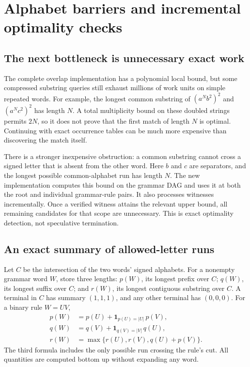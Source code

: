 \section{Alphabet barriers and incremental optimality checks}
\label{sec:lcs-bounds}

\subsection{The next bottleneck is unnecessary exact work}

The complete overlap implementation has a polynomial local bound, but some
compressed substring queries still exhaust millions of work units on simple
repeated words. For example, the longest common substring of
$(a^N b^2)^2$ and $(a^N c^2)^2$ has length $N$. A total multiplicity bound
on these doubled strings permits $2N$, so it does not prove that the first
match of length $N$ is optimal. Continuing with exact occurrence tables
can be much more expensive than discovering the match itself.

There is a stronger inexpensive obstruction: a common substring cannot
cross a signed letter that is absent from the other word. Here $b$ and $c$
are separators, and the longest possible common-alphabet run has length
$N$. The new implementation computes this bound on the grammar DAG and
uses it at both the root and individual grammar-rule pairs. It also
processes witnesses incrementally. Once a verified witness attains the
relevant upper bound, all remaining candidates for that scope are unnecessary.
This is exact optimality detection, not speculative termination.

\subsection{An exact summary of allowed-letter runs}

Let $C$ be the intersection of the two words' signed alphabets. For a
nonempty grammar word $W$, store three lengths: $p(W)$, its longest
prefix over $C$; $q(W)$, its longest suffix over $C$; and $r(W)$, its
longest contiguous substring over $C$. A terminal in $C$ has summary
$(1,1,1)$, and any other terminal has $(0,0,0)$. For a binary rule $W=UV$,
\[
\begin{aligned}
 p(W)&=p(U)+\mathbf 1_{p(U)=|U|}\,p(V),\\
 q(W)&=q(V)+\mathbf 1_{q(V)=|V|}\,q(U),\\
 r(W)&=\max\{r(U),r(V),q(U)+p(V)\}.
\end{aligned}
\]
The third formula includes the only possible run crossing the rule's cut.
All quantities are computed bottom up without expanding any word.

